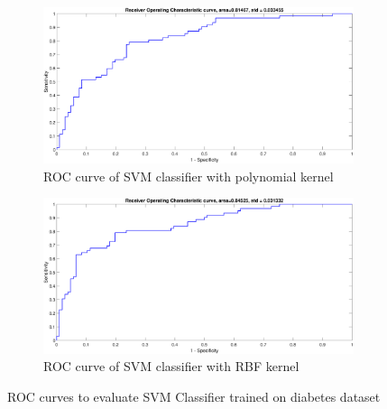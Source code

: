 \documentclass[12pt]{report}
\begin{document}
{\begin{figure}[!ht]
	\begin{subfigure}{.35\textwidth}
		\centering
		\captionsetup{width=0.8\linewidth}
		\includegraphics[height=.65\linewidth, width=0.9\linewidth]{diabetes/dia_poly_ROC.eps}
		\caption{ROC curve of SVM classifier with polynomial kernel}
		\label{fig:dia_poly_ROC}
	\end{subfigure}%
	\begin{subfigure}{.35\textwidth}
		\centering
		\captionsetup{width=0.8\linewidth}
		\includegraphics[height=.65\linewidth, width=0.9\linewidth]{diabetes/dia_RBF_ROC.eps}
		\caption{ROC curve of SVM classifier with RBF kernel} 
		\label{fig:dia_RBF_ROC}
	\end{subfigure}
	\caption{ROC curves to evaluate SVM Classifier trained on diabetes dataset}
	\label{fig:dia_ROC}
\end{figure}
 \begin{figure}[!ht]
	\begin{floatrow}

\end{floatrow}
\end{figure}}
\end{document}
